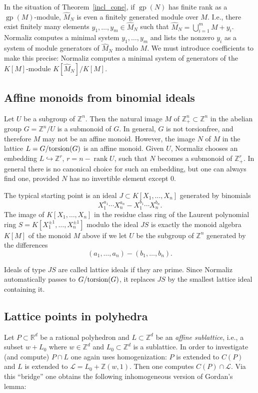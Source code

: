 \documentclass[12pt,a4paper]{scrartcl}
\theoremstyle{definition}
\def\ZZ{{\mathbb Z}}
\def\RR{{\mathbb R}}
\def\cL{{\mathcal L}}
\DeclareMathOperator{\gp}{gp}
\DeclareMathOperator{\rank}{rank}
\begin{document}
In the situation of Theorem~\ref{incl_cone}, if $\gp(N)$ has finite rank as a $\gp(M)$-module, $\widehat M_N$ is even a finitely generated module over $M$. I.e., there exist finitely many elements $y_1,\dots,y_m\in \widehat M_N$ such that $\widehat M_N=\bigcup_{i=1}^m M+y_i$. Normaliz computes a minimal system $y_1,\dots,y_m$ and lists the nonzero $y_i$ as a system of module generators of $\widehat M_N$ modulo $M$. We must introduce coefficients to make this precise: Normaliz computes a minimal system of generators of the $K[M]$-module $K[\widehat M_N]/K[M]$.

\subsection{Affine monoids from binomial ideals}\label{binomials}

Let $U$ be a subgroup of $\ZZ^n$. Then the natural image $M$ of
$\ZZ_+^n\subset\ZZ^n$ in the abelian group $G=\ZZ^n/U$ is a
submonoid of $G$. In general, $G$ is not torsionfree, and
therefore $M$ may not be an affine monoid. However, the image
$N$ of $M$ in the lattice $L=G/\textup{torsion}(G)$ is an affine
monoid. Given $U$, Normaliz chooses an embedding
$L\hookrightarrow\ZZ^r$, $r=n-\rank U$, such that $N$ becomes a
submonoid of $\ZZ_+^r$. In general there is no canonical choice
for such an embedding, but one can always find one, provided
$N$ has no invertible element except $0$.

The typical starting point is an ideal $J\subset
K[X_1,\dots,X_n]$ generated by binomials
$$
X_1^{a_1}\cdots X_n^{a_n}-X_1^{b_1}\cdots X_n^{b_n}.
$$
The image of $K[X_1,\dots,X_n]$ in the residue class ring of
the Laurent polynomial ring $S=K[X_1^{\pm1},\dots,X_n^{\pm1}]$
modulo the ideal $JS$ is exactly the monoid algebra $K[M]$ of
the monoid $M$ above if we let $U$ be the subgroup of $\ZZ^n$
generated by the differences
$$
(a_1,\dots,a_n)-(b_1,\dots,b_n).
$$

Ideals of type $JS$ are called lattice ideals if they are
prime. Since Normaliz automatically passes to
$G/\textup{torsion}(G)$, it replaces $JS$ by the smallest lattice
ideal containing it.

\subsection{Lattice points in polyhedra}\label{latt_hedra}

Let $P\subset \RR^d$ be a rational polyhedron and $L\subset \ZZ^d$ be an \emph{affine sublattice}, i.e., a subset $w+L_0$ where $w\in\ZZ^d$ and $L_0\subset \ZZ^d$ is a sublattice. In order to investigate (and compute) $P\cap L$ one again uses homogenization: $P$ is extended to $C(P)$ and $L$ is extended to $\cL=L_0+\ZZ(w,1)$. Then one computes $C(P)\cap \cL$. Via this ``bridge'' one obtains the following inhomogeneous version of Gordan's lemma:
\end{document}
